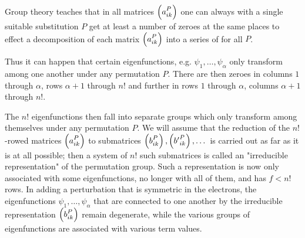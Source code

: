 \begin{paper}{1}
\subsection{} Group theory teaches that in all matrices $\Aikp{a}{ik}{P}$ one can always with a single suitable substitution $P$ get at least a number of zeroes at the same places to effect a decomposition of each matrix $\Aikp{a}{ik}{P}$ into a series of 
for all $P$.

Thus it can happen that certain eigenfunctions, e.g. $\psi_1,\dots,\psi_\alpha$ only transform among one another under any permutation $P$. There are then zeroes in columns $1$ through $\alpha$, rows $\alpha+1$ through $n!$ and further in rows $1$ through $\alpha$, columns $\alpha+1$ through $n!$.

The $n!$ eigenfunctions then fall into separate groups which only transform among themselves under any permutation $P$. We will assume that the reduction of the $n!$-rowed matrices $\Aikp{a}{ik}{P}$ to submatrices $\Aikp{b}{ik}{P}, \Aikp{b'}{ik}{P}, \dots$ is carried out as far as it is at all possible; then a system of $n!$ such submatrices
is called an "irreducible representation" of the permutation group. Such a representation is now only associated with some eigenfunctions, no longer with all of them, and has $f<n!$ rows. In adding a perturbation that is symmetric in the electrons, the eigenfunctions $\psi_1,\dots,\psi_\alpha$ that are connected to one another by the irreducible representation $\Aikp{b}{ik}{P}$ remain degenerate, while the various groups of eigenfunctions are associated with various term values.


\end{paper}

